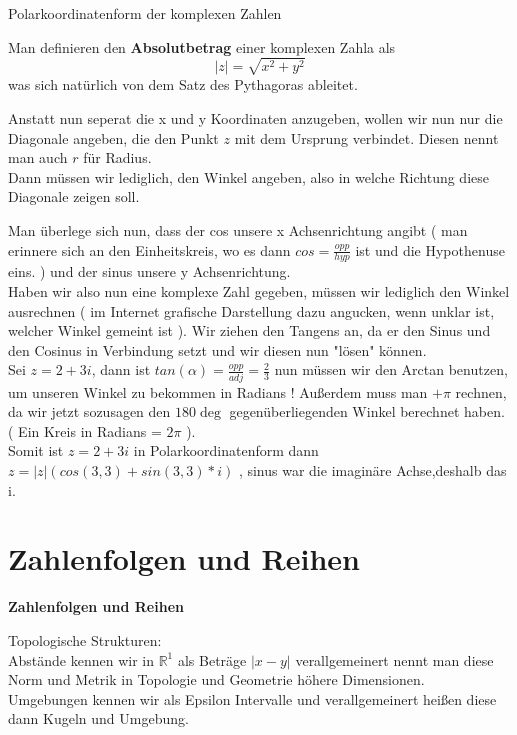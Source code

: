 \documentclass[headsepline,12pt,a4paper]{scrartcl}
\begin{document}
\begin{center}
\item[Polarkoordinatenform der komplexen Zahlen]
\end{center}
\item Man definieren den \textbf{Absolutbetrag} einer komplexen Zahla als 
$$ |z| = \sqrt{x^2+y^2} $$
was sich natürlich von dem Satz des Pythagoras ableitet. \\
\item Anstatt nun seperat die x und y Koordinaten anzugeben, wollen wir nun nur die Diagonale angeben, die den Punkt $z$ mit dem Ursprung verbindet. Diesen nennt man auch $r$ für Radius. \\
Dann müssen wir lediglich, den Winkel angeben, also in welche Richtung diese Diagonale zeigen soll. \\
\item Man überlege sich nun, dass der cos unsere x Achsenrichtung angibt ( man erinnere sich an den Einheitskreis, wo es dann $ cos = \frac{opp}{hyp} $ ist und die Hypothenuse eins. ) und der sinus unsere y Achsenrichtung. \\

Haben wir also nun eine komplexe Zahl gegeben, müssen wir lediglich den Winkel ausrechnen ( im Internet grafische Darstellung dazu angucken, wenn unklar ist, welcher Winkel gemeint ist ). Wir ziehen den Tangens an, da er den Sinus und den Cosinus in Verbindung setzt und wir diesen nun "lösen" können.  \\

Sei $z = 2 + 3i $, dann ist $ tan(\alpha)= \frac{opp}{adj} = \frac{2}{3} $ nun müssen wir den Arctan benutzen, um unseren Winkel zu bekommen in Radians ! Außerdem muss man $ + \pi $ rechnen, da wir jetzt sozusagen den $ 180 \deg $ gegenüberliegenden Winkel berechnet haben. ( Ein Kreis in Radians = $ 2 \pi  $ ). \\

Somit ist $z = 2 + 3i $ in Polarkoordinatenform dann $ z = |z| ( cos(3,3) + sin (3,3) * i ) $ , sinus war die imaginäre Achse,deshalb das i. \\

\newpage

\section*{Zahlenfolgen und Reihen}

\begin{center}
\item[\textbf{Zahlenfolgen und Reihen}]
\end{center}
\item Topologische Strukturen: \\
Abstände kennen wir in $ \mathbb{R}^1$ als Beträge $|x-y|$ verallgemeinert nennt man diese Norm und Metrik in Topologie und Geometrie höhere Dimensionen. \\
Umgebungen kennen wir als Epsilon Intervalle und verallgemeinert heißen diese dann Kugeln und Umgebung. \\
\end{document}
